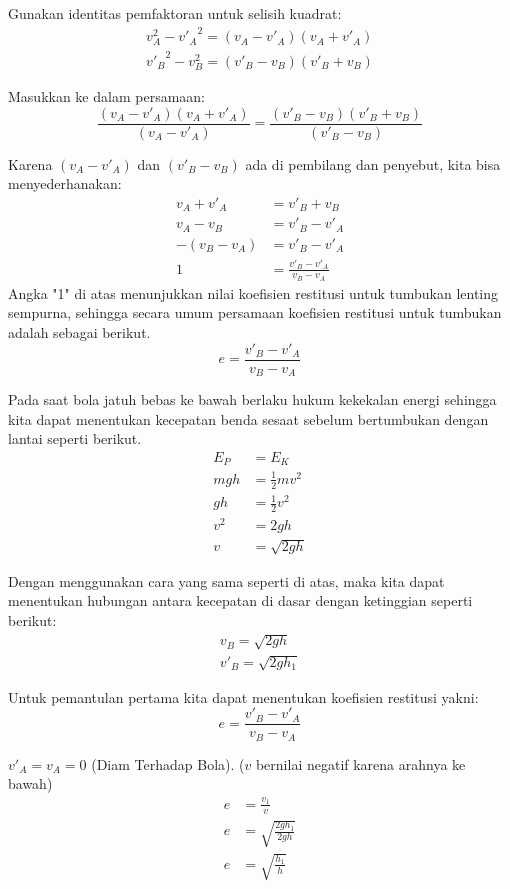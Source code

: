 Gunakan identitas pemfaktoran untuk selisih kuadrat:
\begin{gather}
    v_A^2 - {v'_A}^2 = (v_A - v'_A)(v_A + v'_A) \\
    {v'_B}^2 - v_B^2 = (v'_B - v_B)(v'_B + v_B)
\end{gather}

Masukkan ke dalam persamaan:
\begin{equation}
    \frac{(v_A - v'_A)(v_A + v'_A)}{(v_A - v'_A)} = \frac{(v'_B - v_B)(v'_B + v_B)}{(v'_B - v_B)}
\end{equation}

Karena \( (v_A - v'_A) \) dan \( (v'_B - v_B) \) ada di pembilang dan penyebut, kita bisa menyederhanakan:
\begin{align}
    v_A + v'_A &= v'_B + v_B \\
    v_A - v_B &= v'_B - v'_A \\
    -(v_B - v_A) &= v'_B - v'_A \\
    1 &= \frac{v'_B - v'_A}{v_B - v_A}
\end{align}
Angka "1" di atas menunjukkan nilai koefisien restitusi untuk tumbukan lenting 
sempurna, sehingga secara umum persamaan koefisien restitusi untuk tumbukan adalah sebagai berikut.
\begin{equation}
        e = \frac{v'_B - v'_A}{v_B - v_A}
\end{equation}

Pada saat bola jatuh bebas ke bawah berlaku hukum kekekalan energi sehingga kita 
dapat menentukan kecepatan benda sesaat sebelum bertumbukan dengan lantai 
seperti berikut. 
\begin{align}
    E_P &= E_K \\
    mgh &= \frac{1}{2} mv^2 \\
    gh &= \frac{1}{2} v^2 \\
    v^2 &= 2gh \\
    v &= \sqrt{2gh}
\end{align}

Dengan menggunakan cara yang sama seperti di atas, maka kita dapat menentukan 
hubungan antara kecepatan di dasar dengan ketinggian seperti berikut:
\begin{gather}
    v_B = \sqrt{2gh} \\
    v'_B = \sqrt{2gh_1}
\end{gather}

Untuk pemantulan pertama kita dapat menentukan koefisien restitusi yakni:
\begin{equation}
        e = \frac{v'_B - v'_A}{v_B - v_A}
\end{equation}

$ v'_A = v_A = 0 $ (Diam Terhadap Bola).
($v$ bernilai negatif karena arahnya ke bawah)
\begin{align}
    e &= \frac{v_1}{v} \\
    e &= \sqrt{\frac{2gh_1}{2gh}} \\
    e &= \sqrt{\frac{h_1}{h}} 
\end{align}

